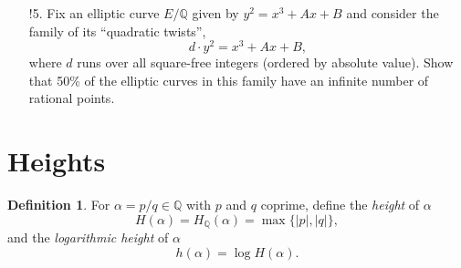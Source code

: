 \documentclass[a4paper]{article}
\theoremstyle{plain}
\theoremstyle{remark}
\theoremstyle{definition}
\newtheorem*{definition}{Definition}
\renewcommand{\O}{\mathcal{O}}
\newcommand{\F}{\mathbb{F}}
\newcommand{\Z}{\mathbb{Z}}
\newcommand{\Q}{\mathbb{Q}}
\begin{document}
\begin{enumerate}
\begin{proof}[Solution]
            \textbf{Proof of claim:} Suppose $P=(x_1,y_1)$, $Q=(x_2,y_2)$, and
            $P\oplus Q=(x_3,y_3)$. Write $s=\frac{y_2-y_1}{x_2-x_1}\in\Z_p$,
            where $x_2-x_1$ is invertible in $\Z_p$ since
            $\bar P\oplus\bar Q\ne\O$. We have a monic cubic
            \begin{equation*}
                (y_1+s(x-x_1))^2 + (a_1x+a_3)(y_1+s(x-x_1))
                    = x^3 + a_2x^2 + a_4x + a_6
            \end{equation*}
            in $x$ over $\Z_p$, whose roots in $\Q_p$ are $x_1,x_2,x_3$, and
            whose roots upon reduction to $\F_p$ are the $x$-coordinates of
            $\bar P,\bar Q,\bar P\oplus\bar Q$. Factoring out $(x-x_1)(x-x_2)$
            we see that $x_3\in\Z_p$, since the equation is monic, and reducing
            to $\F_p$ we see that $x_3$ lifts the $x$-coordinate of
            $\bar P\oplus\bar Q$. Similarly, factoring out the root
            $y_1+s(x_1-x_3)$ of the monic quadratic
            \begin{equation*}
                y^2 + a_1x_3y + a_3y = x_3^3 + a_2x_3^2 + a_4x_3 + a_6
            \end{equation*}
            in $y$ over $\Z_p$, we see that $y_3\in\Z_p$ lifts the
            $y$-coordinate of $\bar P\oplus\bar Q$.
        \end{proof}

    \item[!5.] Fix an elliptic curve $E/\Q$ given by $y^2=x^3+Ax+B$ and consider
        the family of its ``quadratic twists'',
        \begin{equation*}
            d\cdot y^2=x^3+Ax+B,
        \end{equation*}
        where $d$ runs over all square-free integers (ordered by absolute
        value). Show that 50\% of the elliptic curves in this family have an
        infinite number of rational points.
\end{enumerate}

\section{Heights}

\begin{definition}
    For $\alpha=p/q\in\Q$ with $p$ and $q$ coprime, define the \emph{height} of
    $\alpha$
    \begin{equation*}
        H(\alpha) = H_\Q(\alpha) = \max\{|p|,|q|\},
    \end{equation*}
    and the \emph{logarithmic height} of $\alpha$
    \begin{equation*}
        h(\alpha) = \log H(\alpha).
    \end{equation*}
\end{definition}
\end{document}
